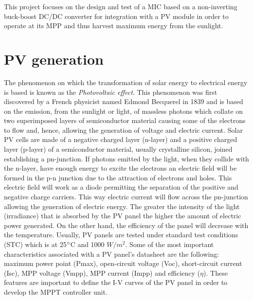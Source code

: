 This project focuses on the design and test of a MIC based on a non-inverting buck-boost DC/DC converter for integration with a PV module in order to operate at its MPP and thus harvest maximum energy from the sunlight. 

\section{PV generation}

The phenomenon on which the transformation of solar energy to electrical energy is based is known as the \textit{Photovoltaic effect}. This phenomenon was first discovered by a French physicist named Edmond Becquerel in 1839 and is based on the emission, from the sunlight or light, of massless photons which collate on two superimposed layers of semiconductor material causing some of the electrons to flow and, hence, allowing the generation of voltage and electric current. Solar PV cells are made of a negative charged layer (n-layer) and a positive charged layer (p-layer) of a semiconductor material, usually crystalline silicon, joined establishing a pn-junction. If photons emitted by the light, when they collide with the n-layer,  have enough energy to excite the electrons an electric field will be formed in the p-n junction due to the attraction of electrons and holes. This electric field will work as a diode permitting the separation of the positive and negative charge carriers.  This way electric current will flow across the pn-junction allowing the generation of electric energy. %
 The greater the intensity of the light (irradiance) that is absorbed by the PV panel the higher the amount of electric power generated. On the other hand, the efficiency of the panel will decrease with the temperature. Usually, PV panels are tested under standard test conditions (STC) which is at 25$\dec$C and 1000 $W/ m^2$. %
Some of the most important characteristics associated with a PV panel’s datasheet are the following: maximum power point (Pmax), open-circuit voltage (Voc), short-circuit current (Isc), MPP voltage (Vmpp), MPP current (Impp) and efficiency ($\eta$).  %
These features are important to define the I-V curves of the PV panel in order to develop the MPPT controller unit.

